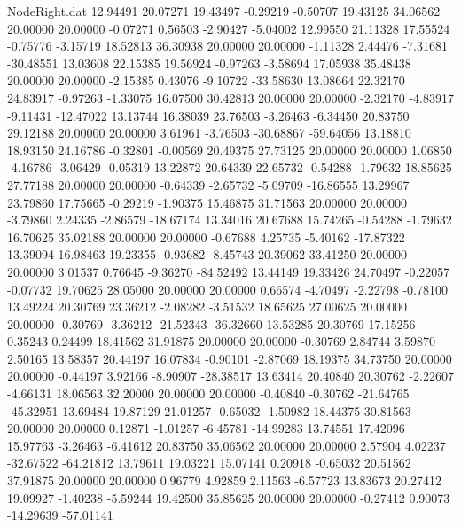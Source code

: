\begin{filecontents}{NodeRight.dat}
  12.94491   20.07271   19.43497    -0.29219   -0.50707   19.43125   34.06562   20.00000   20.00000   -0.07271    0.56503   -2.90427   -5.04002
  12.99550   21.11328   17.55524    -0.75776   -3.15719   18.52813   36.30938   20.00000   20.00000   -1.11328    2.44476   -7.31681  -30.48551
  13.03608   22.15385   19.56924    -0.97263   -3.58694   17.05938   35.48438   20.00000   20.00000   -2.15385    0.43076   -9.10722  -33.58630
  13.08664   22.32170   24.83917    -0.97263   -1.33075   16.07500   30.42813   20.00000   20.00000   -2.32170   -4.83917   -9.11431  -12.47022
  13.13744   16.38039   23.76503    -3.26463   -6.34450   20.83750   29.12188   20.00000   20.00000    3.61961   -3.76503  -30.68867  -59.64056
  13.18810   18.93150   24.16786    -0.32801   -0.00569   20.49375   27.73125   20.00000   20.00000    1.06850   -4.16786   -3.06429   -0.05319
  13.22872   20.64339   22.65732    -0.54288   -1.79632   18.85625   27.77188   20.00000   20.00000   -0.64339   -2.65732   -5.09709  -16.86555
  13.29967   23.79860   17.75665    -0.29219   -1.90375   15.46875   31.71563   20.00000   20.00000   -3.79860    2.24335   -2.86579  -18.67174
  13.34016   20.67688   15.74265    -0.54288   -1.79632   16.70625   35.02188   20.00000   20.00000   -0.67688    4.25735   -5.40162  -17.87322
  13.39094   16.98463   19.23355    -0.93682   -8.45743   20.39062   33.41250   20.00000   20.00000    3.01537    0.76645   -9.36270  -84.52492
  13.44149   19.33426   24.70497    -0.22057   -0.07732   19.70625   28.05000   20.00000   20.00000    0.66574   -4.70497   -2.22798   -0.78100
  13.49224   20.30769   23.36212    -2.08282   -3.51532   18.65625   27.00625   20.00000   20.00000   -0.30769   -3.36212  -21.52343  -36.32660
  13.53285   20.30769   17.15256     0.35243    0.24499   18.41562   31.91875   20.00000   20.00000   -0.30769    2.84744    3.59870    2.50165
  13.58357   20.44197   16.07834    -0.90101   -2.87069   18.19375   34.73750   20.00000   20.00000   -0.44197    3.92166   -8.90907  -28.38517
  13.63414   20.40840   20.30762    -2.22607   -4.66131   18.06563   32.20000   20.00000   20.00000   -0.40840   -0.30762  -21.64765  -45.32951
  13.69484   19.87129   21.01257    -0.65032   -1.50982   18.44375   30.81563   20.00000   20.00000    0.12871   -1.01257   -6.45781  -14.99283
  13.74551   17.42096   15.97763    -3.26463   -6.41612   20.83750   35.06562   20.00000   20.00000    2.57904    4.02237  -32.67522  -64.21812
  13.79611   19.03221   15.07141     0.20918   -0.65032   20.51562   37.91875   20.00000   20.00000    0.96779    4.92859    2.11563   -6.57723
  13.83673   20.27412   19.09927    -1.40238   -5.59244   19.42500   35.85625   20.00000   20.00000   -0.27412    0.90073  -14.29639  -57.01141

\end{filecontents}
